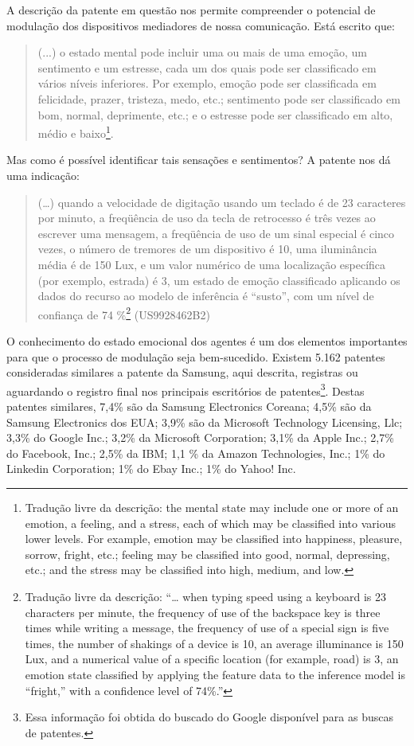 A descrição da patente em questão nos permite compreender o potencial de
modulação dos dispositivos mediadores de nossa comunicação. Está escrito
que:

\begin{quote}
(...) o estado mental pode incluir uma ou mais de uma emoção, um
sentimento e um estresse, cada um dos quais pode ser classificado em
vários níveis inferiores. Por exemplo, emoção pode ser classificada em
felicidade, prazer, tristeza, medo, etc.; sentimento pode ser
classificado em bom, normal, deprimente, etc.; e o estresse pode ser
classificado em alto, médio e baixo\footnote{Tradução livre da
  descrição: the mental state may include one or more of an emotion, a
  feeling, and a stress, each of which may be classified into various
  lower levels. For example, emotion may be classified into happiness,
  pleasure, sorrow, fright, etc.; feeling may be classified into good,
  normal, depressing, etc.; and the stress may be classified into high,
  medium, and low.}.
\end{quote}

Mas como é possível identificar tais sensações e sentimentos? A patente
nos dá uma indicação:

\begin{quote}
(\ldots{}) quando a velocidade de digitação usando um teclado é de 23
caracteres por minuto, a freqüência de uso da tecla de retrocesso é três
vezes ao escrever uma mensagem, a freqüência de uso de um sinal especial
é cinco vezes, o número de tremores de um dispositivo é 10, uma
iluminância média é de 150 Lux, e um valor numérico de uma localização
específica (por exemplo, estrada) é 3, um estado de emoção classificado
aplicando os dados do recurso ao modelo de inferência é ``susto'', com
um nível de confiança de 74 \%\footnote{Tradução livre da descrição:
  ``\ldots{} when typing speed using a keyboard is 23 characters per
  minute, the frequency of use of the backspace key is three times while
  writing a message, the frequency of use of a special sign is five
  times, the number of shakings of a device is 10, an average
  illuminance is 150 Lux, and a numerical value of a specific location
  (for example, road) is 3, an emotion state classified by applying the
  feature data to the inference model is ``fright,'' with a confidence
  level of 74\%.''} (US9928462B2)
\end{quote}

O conhecimento do estado emocional dos agentes é um dos elementos
importantes para que o processo de modulação seja bem-sucedido. Existem
5.162 patentes consideradas similares a patente da Samsung, aqui
descrita, registras ou aguardando o registro final nos principais
escritórios de patentes\footnote{Essa informação foi obtida do buscado
  do Google disponível para as buscas de patentes.}. Destas patentes
similares, 7,4\% são da Samsung Electronics Coreana; 4,5\% são da
Samsung Electronics dos EUA; 3,9\% são da Microsoft Technology
Licensing, Llc; 3,3\% do Google Inc.; 3,2\% da Microsoft Corporation;
3,1\% da Apple Inc.; 2,7\% do Facebook, Inc.; 2,5\% da IBM; 1,1 \% da
Amazon Technologies, Inc.; 1\% do Linkedin Corporation; 1\% do Ebay
Inc.; 1\% do Yahoo! Inc.

